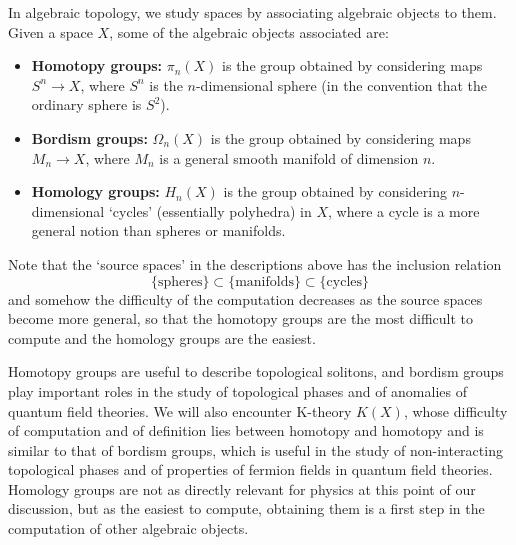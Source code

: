 \documentclass[12pt]{article}
\numberwithin{equation}{section}
\theoremstyle{remark}
\begin{document}
In algebraic topology, we study spaces by associating algebraic objects to them.
Given a space $X$, some of the algebraic objects associated are:
\begin{itemize}
\item \textbf{Homotopy groups:} $\pi_n(X)$ is the group obtained by considering maps $S^n \to X$,
where $S^n$ is the $n$-dimensional sphere (in the convention that the ordinary sphere is $S^2$).
\item \textbf{Bordism groups:} $\Omega_n(X)$ is the group obtained by considering maps $M_n \to X$,
where $M_n$ is a general smooth manifold of dimension $n$.
\item \textbf{Homology groups:} $H_n(X)$ is the group obtained by considering $n$-dimensional `cycles' (essentially polyhedra)
 in $X$, where a cycle is a more general notion than spheres or manifolds.
\end{itemize}
Note that the `source spaces' in the descriptions above has the inclusion relation \begin{equation}
  \{\text{spheres}\} \subset \{\text{manifolds}\} \subset \{\text{cycles}\}
\end{equation} and somehow the difficulty of the computation decreases as the source spaces become more general,
so that the homotopy groups are the most difficult to compute and the homology groups are the easiest.

Homotopy groups are useful to describe topological solitons,
and bordism groups play important roles in the study of topological phases
and of anomalies of quantum field theories.
We will also encounter K-theory $K(X)$, whose difficulty of computation and of definition lies between homotopy and homotopy 
and is similar to that of bordism groups, 
which is useful in the study of non-interacting topological phases
and of properties of fermion fields in quantum field theories.
Homology groups are not as directly relevant for physics at this point of our discussion,
but as the easiest to compute, obtaining them is a first step in the computation of other algebraic objects.
\end{document}
